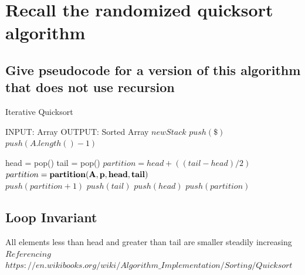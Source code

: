 \documentclass[10pt,letterpaper]{article}
\begin{document}
\newpage
\section{Recall the randomized quicksort algorithm}

\subsection{Give pseudocode for a version of this algorithm that does not use recursion}

\begin{algorithm}
\caption{Iterative Quicksort}\label{euclid}
\begin{algorithmic}[1]
\State INPUT: Array
\State OUTPUT: Sorted Array
\State $new Stack$
\State $push(\$)$
\State $push(A.length() - 1)$

\State head = pop()
\State tail = pop()
    \State $partition = head + ((tail - head)/2)$
    \State $partition = \bf{partition}(A, p, head, tail)$
    \\
    \State $push(partition + 1)$
    \State $push(tail)$
    \State $push(head)$
    \State $push(partition)$
    \EndIf
\EndWhile
\end{algorithmic}
\end{algorithm}

\subsection{Loop Invariant}
All elements less than head and greater than tail are smaller steadily increasing
$Referencing$ $https://en.wikibooks.org/wiki/Algorithm\_Implementation/Sorting/Quicksort$\\
\end{document}
